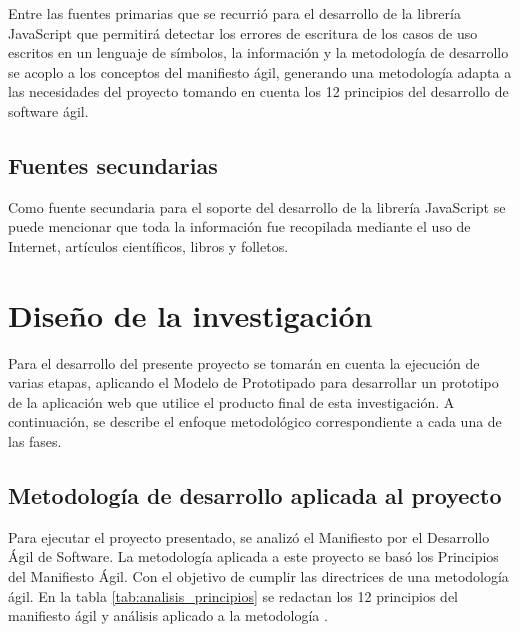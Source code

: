 Entre las fuentes primarias que se recurrió para el desarrollo de la librería JavaScript que permitirá detectar los errores de escritura de los casos de uso escritos en un lenguaje de símbolos, la información y la metodología de desarrollo se acoplo a los conceptos del manifiesto ágil, generando una metodología adapta a las necesidades del proyecto tomando en cuenta los 12 principios del desarrollo de software ágil.

\subsection{Fuentes secundarias}

Como fuente secundaria para el soporte del desarrollo de la librería JavaScript se puede mencionar que toda la información fue recopilada mediante el uso de Internet, artículos científicos, libros y folletos.

\section{Diseño de la investigación}

Para el desarrollo del presente proyecto se tomarán en cuenta la ejecución de varias etapas, aplicando el Modelo de Prototipado para desarrollar un prototipo de la aplicación web que utilice el producto final de esta investigación. A continuación, se describe el enfoque metodológico correspondiente a cada una de las fases. 

\subsection{Metodología de desarrollo aplicada al proyecto}

Para ejecutar el proyecto presentado, se analizó el Manifiesto por el Desarrollo Ágil de Software. La metodología aplicada a este proyecto se basó los Principios del Manifiesto Ágil. Con el objetivo de cumplir las directrices de una metodología ágil. En la tabla \ref{tab:analisis_principios} se redactan los 12 principios del manifiesto ágil y análisis aplicado a la metodología \cite{managil}.

